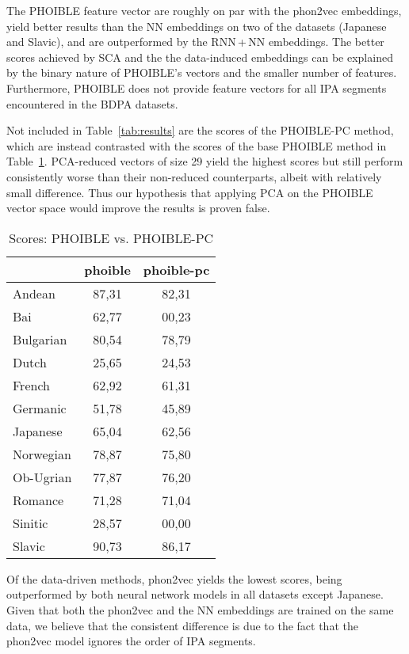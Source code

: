 \documentclass[a4paper]{report}
\begin{document}
The PHOIBLE feature vector are roughly on par with the phon2vec embeddings,
yield better results than the NN embeddings on two of the datasets (Japanese and Slavic), and are outperformed by the RNN\,+\,NN embeddings.
The better scores achieved by SCA and the the data-induced embeddings can be explained by the binary nature of PHOIBLE's vectors and the smaller number of features.
Furthermore, PHOIBLE does not provide feature vectors for all IPA segments encountered in the BDPA datasets.

Not included in Table~\ref{tab:results} are the scores of the PHOIBLE-PC method,
which are instead contrasted with the scores of the base PHOIBLE method in Table~\ref{tab:results-phoible}.
PCA-reduced vectors of size 29 yield the highest scores
but still perform consistently worse than their non-reduced counterparts, albeit with relatively small difference.
Thus our hypothesis that applying PCA on the PHOIBLE vector space would improve the results is proven false.

\begin{table}[h]
	\centering\small
	\begin{tabular}{l *{2}{c}}
		\toprule
		& phoible & phoible-pc \\
		\midrule
		Andean		&	87,31 &	82,31 \\
		Bai			&	62,77 &	00,23 \\
		Bulgarian	&	80,54 &	78,79 \\
		Dutch		&	25,65 &	24,53 \\
		French		&	62,92 &	61,31 \\
		Germanic	&	51,78 &	45,89 \\
		Japanese	&	65,04 &	62,56 \\
		Norwegian	&	78,87 &	75,80 \\
		Ob-Ugrian	&	77,87 &	76,20 \\
		Romance		&	71,28 &	71,04 \\
		Sinitic		&	28,57 &	00,00 \\
		Slavic		&	90,73 &	86,17 \\
		\bottomrule
	\end{tabular}
	\caption{Scores: PHOIBLE vs. PHOIBLE-PC}
	\label{tab:results-phoible}
\end{table}

Of the data-driven methods, phon2vec yields the lowest scores, being outperformed by both neural network models in all datasets except Japanese.
Given that both the phon2vec and the NN embeddings are trained on the same data,
we believe that the consistent difference is due to the fact that the phon2vec model ignores the order of IPA segments.
\end{document}
